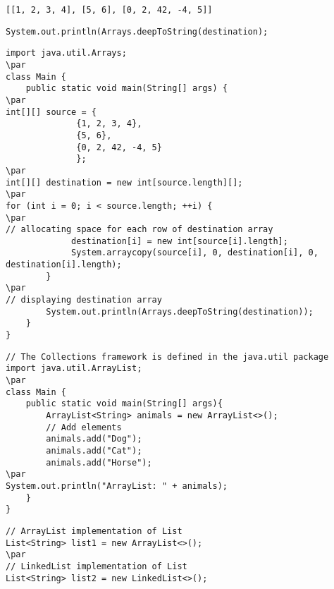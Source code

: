 \documentclass{book}
\def\lthtmlcheckvsize{\ifdim\ht\sizebox<\vsize 
  \ifdim\wd\sizebox<\hsize\expandafter\hfill\fi \expandafter\vfill
  \else\expandafter\vss\fi}%
\begin{document}
{\newpage\clearpage
{}%
\begin{lstlisting}
[[1, 2, 3, 4], [5, 6], [0, 2, 42, -4, 5]]
\end{lstlisting}%
\lthtmlfigureZ
\lthtmlcheckvsize\clearpage}

{\newpage\clearpage
{}%
\begin{lstlisting}
System.out.println(Arrays.deepToString(destination);
\end{lstlisting}%
\lthtmlfigureZ
\lthtmlcheckvsize\clearpage}

{\newpage\clearpage
{}%
\begin{lstlisting}
import java.util.Arrays;
\par
class Main {
    public static void main(String[] args) {
\par
int[][] source = {
              {1, 2, 3, 4}, 
              {5, 6},
              {0, 2, 42, -4, 5}
              };
\par
int[][] destination = new int[source.length][];
\par
for (int i = 0; i < source.length; ++i) {
\par
// allocating space for each row of destination array
             destination[i] = new int[source[i].length];
             System.arraycopy(source[i], 0, destination[i], 0, destination[i].length);
        }
\par
// displaying destination array
        System.out.println(Arrays.deepToString(destination));      
    }
}
\end{lstlisting}%
\lthtmlfigureZ
\lthtmlcheckvsize\clearpage}

{\newpage\clearpage
{}%
\begin{lstlisting}
// The Collections framework is defined in the java.util package
import java.util.ArrayList;
\par
class Main {
    public static void main(String[] args){
        ArrayList<String> animals = new ArrayList<>();
        // Add elements
        animals.add("Dog");
        animals.add("Cat");
        animals.add("Horse");
\par
System.out.println("ArrayList: " + animals);
    }
}
\end{lstlisting}%
\lthtmlfigureZ
\lthtmlcheckvsize\clearpage}

{\newpage\clearpage
{}%
\begin{lstlisting}
// ArrayList implementation of List
List<String> list1 = new ArrayList<>();
\par
// LinkedList implementation of List
List<String> list2 = new LinkedList<>();
\end{lstlisting}%
\lthtmlfigureZ
\lthtmlcheckvsize\clearpage}
\end{document}
